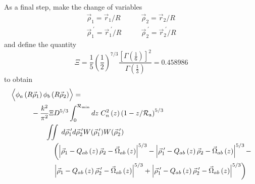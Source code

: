 As a final step, make the change of variables
\begin{equation}
\begin{aligned}
\vec{\rho}_{1} = \vec{r}_{1}/R \quad & \quad \vec{\rho}_{2} = \vec{r}_{2}/R \\
\vec{\rho}^{\;\prime}_{1} = \vec{r}^{\;\prime}_{1}/R \quad & \quad \vec{\rho}^{\;\prime}_{2} = \vec{r}^{\;\prime}_{2}/R
\end{aligned}
\end{equation}
and define the quantity 
\begin{equation}\label{eqn:Xi}
\Xi = \frac{1}{5}\left(\frac{1}{2}\right)^{7/3} \frac{\left[\Gamma\left(\frac{1}{6}\right)\right]^{2}}{\Gamma\left(\frac{1}{3}\right)} = 0.458986
\end{equation}
to obtain
\begin{equation}\label{eqn:prphase_n7}
\begin{aligned}
&\left\langle \vphantom{\hat{\phi}_{a}} \phi_{a}\left(R\vec{\rho}_{1}\right) \phi_{b}\left(R\vec{\rho}_{2}\right)\right\rangle = \\ 
&\quad\quad\quad
 -\frac{k^{2}}{\pi^{2}} \Xi D^{5/3}
\int_{0}^{\mathcal{R}_{\rm min}} dz\;C_{n}^{2}\left(z\right) \left(1 - z/\mathcal{R}_{\rm a}\right)^{5/3}\\
& \quad\quad\quad\quad\quad
\iint \; d\vec{\rho}^{\;\prime}_{1}d\vec{\rho}^{\;\prime}_{2}  
W(\vec{\rho}^{\;\prime}_{1}) W(\vec{\rho}^{\;\prime}_{2}) \\
& \quad\quad\quad\quad\quad\quad
\left(\left\vert \vec{\rho}_{1}  - Q_{ab}\left(z\right)\vec{\rho}_{2} - \vec{\Omega}_{ab}\left(z\right)\right\vert^{5/3} -
\left\vert \vec{\rho}^{\;\prime}_{1}  - Q_{ab}\left(z\right)\vec{\rho}_{2} - \vec{\Omega}_{ab}\left(z\right)\right\vert^{5/3} -
\right. \\
& \quad\quad\quad\quad\quad\quad
\left.
\left\vert \vec{\rho}_{1}  - Q_{ab}\left(z\right)\vec{\rho}^{\;\prime}_{2} - \vec{\Omega}_{ab}\left(z\right)\right\vert^{5/3} + 
\left\vert \vec{\rho}^{\;\prime}_{1}  - Q_{ab}\left(z\right)\vec{\rho}^{\;\prime}_{2} - \vec{\Omega}_{ab}\left(z\right)\right\vert^{5/3}\right)
\end{aligned}
\end{equation}


